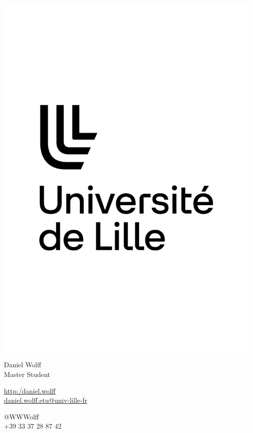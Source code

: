 \documentclass{article}
\begin{document}
\centering \includegraphics[width=.25\linewidth]{logo}\\[5pt]
\parbox{2in}{\Large \centering Daniel Wolff\\[1pt]
\normalsize Master Student}

\vfill
\raggedright
\begin{multicols}{2}
\href{http://john.doe}{http:/daniel.wolff}\\
\href{mailto:me@john.doe}{daniel.wolff.etu@univ-lille-fr}

\columnbreak
\raggedleft
@WWWolff\\
+39 33 37 28 87 42
\end{multicols}
\end{document}
